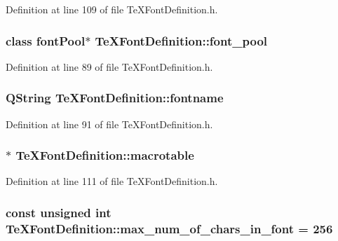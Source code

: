 Definition at line 109 of file Te\+X\+Font\+Definition.\+h.

\hypertarget{classTeXFontDefinition_abc8dfc7c07e8d998150e4ab09f9f9bec}{
\subsubsection[{font\+\_\+pool}]{\setlength{\rightskip}{0pt plus 5cm}class {\bf font\+Pool}$\ast$ Te\+X\+Font\+Definition\+::font\+\_\+pool}}\label{classTeXFontDefinition_abc8dfc7c07e8d998150e4ab09f9f9bec}


Definition at line 89 of file Te\+X\+Font\+Definition.\+h.

\hypertarget{classTeXFontDefinition_a9f1c42427054d44e3a5f110230858c03}{
\subsubsection[{fontname}]{\setlength{\rightskip}{0pt plus 5cm}Q\+String Te\+X\+Font\+Definition\+::fontname}}\label{classTeXFontDefinition_a9f1c42427054d44e3a5f110230858c03}


Definition at line 91 of file Te\+X\+Font\+Definition.\+h.

\hypertarget{classTeXFontDefinition_a03a3d2e16fb85e0847243aec5671c724}{
\subsubsection[{macrotable}]{$\ast$ Te\+X\+Font\+Definition\+::macrotable}}\label{classTeXFontDefinition_a03a3d2e16fb85e0847243aec5671c724}


Definition at line 111 of file Te\+X\+Font\+Definition.\+h.

\hypertarget{classTeXFontDefinition_a542c448736e5c591257ac3889f047d66}{
\subsubsection[{max\+\_\+num\+\_\+of\+\_\+chars\+\_\+in\+\_\+font}]{\setlength{\rightskip}{0pt plus 5cm}const unsigned int Te\+X\+Font\+Definition\+::max\+\_\+num\+\_\+of\+\_\+chars\+\_\+in\+\_\+font = 256\hspace{0.3cm}{\ttfamily [static]}}}\label{classTeXFontDefinition_a542c448736e5c591257ac3889f047d66}


